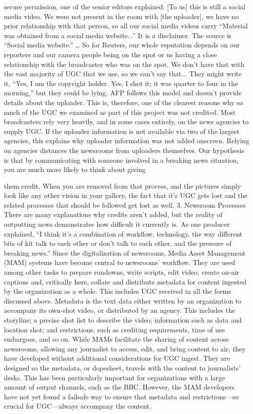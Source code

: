 \begin{enumerate}
secure permission, one of the senior editors explained:
[To us] this is still a social media video. We were not present in the
room with [the uploader], we have no prior relationship with that
person, so all our social media videos carry ``Material was obtained
from a social media website...'' It is a disclaimer. The source is ``Social
media website.'' … So for Reuters, our whole reputation depends on
our reporters and our camera people being on the spot or us having
a close relationship with the broadcaster who was on the spot. We
don't have that with the vast majority of UGC that we use, so we can't
say that... They might write it, ``Yes, I am the copyright holder. Yes, I
shot it; it was quarter to four in the morning,'' but they could be lying.
AFP follows this model and doesn't provide details about the uploader. This
is, therefore, one of the clearest reasons why so much of the UGC we examined
as part of this project was not credited. Most broadcasters rely very
heavily, and in some cases entirely, on the news agencies to supply UGC. If
the uploader information is not available via two of the largest agencies, this
explains why uploader information was not added onscreen.
Relying on agencies distances the newsrooms from uploaders themselves.
Our hypothesis is that by communicating with someone involved in a
breaking news situation, you are much more likely to think about giving

them credit. When you are removed from that process, and the pictures
simply look like any other vision in your gallery, the fact that it's UGC gets
lost and the related processes that should be followed get lost as well.
3. Newsroom Processes
There are many explanations why credits aren't added, but the reality of
outputting news demonstrates how difficult it currently is.
As one producer explained, ``I think it's a combination of workflow, technology,
the way different bits of kit talk to each other or don't talk to each other,
and the pressure of breaking news.''
Since the digitalization of newsrooms, Media Asset Management (MAM)
systems have become central to newsrooms' workflow. They are used
among other tasks to prepare rundowns, write scripts, edit video, create
on-air captions and, critically here, collate and distribute metadata for content
ingested by the organization as a whole. This includes UGC received in
all the forms discussed above. Metadata is the text data either written by an
organization to accompany its own-shot video, or distributed by an agency.
This includes the storyline; a precise shot list to describe the video; information
such as data and location shot; and restrictions, such as crediting
requirements, time of use embargoes, and so on.
While MAMs facilitate the sharing of content across newsrooms, allowing
any journalist to access, edit, and bring content to air, they have developed
without additional considerations for UGC ingest. They are designed so the
metadata, or dopesheet, travels with the content to journalists' desks. This
has been particularly important for organizations with a large amount of
output channels, such as the BBC. However, the MAM developers have not
yet found a failsafe way to ensure that metadata and restrictions—so crucial
for UGC—always accompany the content.


\end{enumerate}
